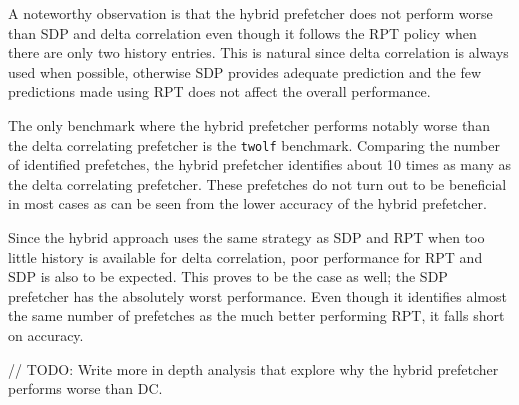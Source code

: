 A noteworthy observation is that the hybrid prefetcher does not perform worse
than SDP and delta correlation even though it follows the RPT policy when there
are only two history entries.
This is natural since delta correlation is always used when possible, otherwise
SDP provides adequate prediction and the few predictions made using RPT does not
affect the overall performance.

The only benchmark where the hybrid prefetcher performs notably worse than the
delta correlating prefetcher is the \texttt{twolf} benchmark.
Comparing the number of identified prefetches, the hybrid prefetcher identifies
about 10 times as many as the delta correlating prefetcher.
These prefetches do not turn out to be beneficial in most cases as can be seen
from the lower accuracy of the hybrid prefetcher.

Since the hybrid approach uses the same strategy as SDP and RPT when too little
history is available for delta correlation, poor performance for RPT and SDP is
also to be expected.
This proves to be the case as well; the SDP prefetcher has the absolutely worst
performance.
Even though it identifies almost the same number of prefetches as the much
better performing RPT, it falls short on accuracy.

// TODO: Write more in depth analysis that explore why the hybrid prefetcher performs worse than DC.


